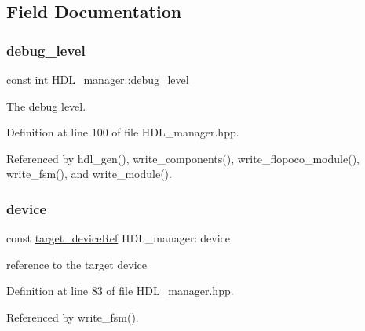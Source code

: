 \subsection{Field Documentation}
\mbox{\label{classHDL__manager_aeaabccc887359c7ae08e66f00d2654d6}} 
\subsubsection{\texorpdfstring{debug\+\_\+level}{debug\_level}}
{\footnotesize\ttfamily const int H\+D\+L\+\_\+manager\+::debug\+\_\+level\hspace{0.3cm}{\ttfamily [private]}}



The debug level. 



Definition at line 100 of file H\+D\+L\+\_\+manager.\+hpp.



Referenced by hdl\+\_\+gen(), write\+\_\+components(), write\+\_\+flopoco\+\_\+module(), write\+\_\+fsm(), and write\+\_\+module().

\mbox{\label{classHDL__manager_a39fc9442d1cb94063f582ea205251c4b}} 
\subsubsection{\texorpdfstring{device}{device}}
{\footnotesize\ttfamily const \hyperlink{target__device_8hpp_acedb2b7a617e27e6354a8049fee44eda}{target\+\_\+device\+Ref} H\+D\+L\+\_\+manager\+::device\hspace{0.3cm}{\ttfamily [private]}}



reference to the target device 



Definition at line 83 of file H\+D\+L\+\_\+manager.\+hpp.



Referenced by write\+\_\+fsm().

\mbox{\label{classHDL__manager_a97f281a1319403619497d1d3fec65787}} 
